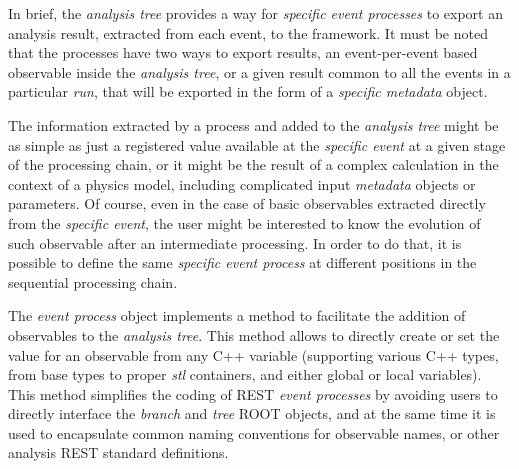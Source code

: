 In brief, the \emph{analysis tree} provides a way for \emph{specific event processes} to export an analysis result, extracted from each event, to the framework. It must be noted that the processes have two ways to export results, an event-per-event based observable inside the \emph{analysis tree}, or a given result common to all the events in a particular \emph{run}, that will be exported in the form of a \emph{specific metadata} object.

The information extracted by a process and added to the \emph{analysis tree} might be as simple as just a registered value available at the \emph{specific event} at a given stage of the processing chain, or it might be the result of a complex calculation in the context of a physics model, including complicated input \emph{metadata} objects or parameters. Of course, even in the case of basic observables extracted directly from the \emph{specific event}, the user might be interested to know the evolution of such observable after an intermediate processing. In order to do that, it is possible to define the same \emph{specific event process} at different positions in the sequential processing chain.




The \emph{event process} object implements a method to facilitate the addition of observables to the \emph{analysis tree}. This method allows to directly create or set the value for an observable from any C++ variable (supporting various C++ types, from base types to proper \emph{stl} containers, and either global or local variables). This method simplifies the coding of REST \emph{event processes} by avoiding users to directly interface the \emph{branch} and \emph{tree} ROOT objects, and at the same time it is used to encapsulate common naming conventions for observable names, or other analysis REST standard definitions.

